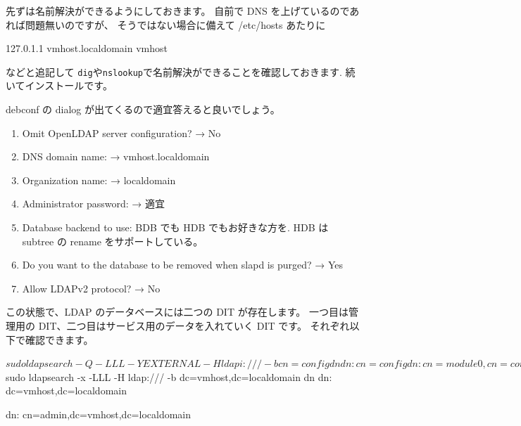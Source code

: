 \documentclass[mingoth,a4paper]{jsarticle}
\begin{document}
先ずは名前解決ができるようにしておきます。
自前で DNS を上げているのであれば問題無いのですが、
そうではない場合に備えて /etc/hosts あたりに
\begin{commandline}
  127.0.1.1     vmhost.localdomain vmhost
\end{commandline}
などと追記して
\texttt{dig}や\texttt{nslookup}で名前解決ができることを確認しておきます.
%
続いてインストールです。
debconf の dialog が出てくるので適宜答えると良いでしょう。
\begin{enumerate}
\item Omit OpenLDAP server configuration?
  → No
\item DNS domain name:
  → vmhost.localdomain
\item Organization name:
  → localdomain
\item Administrator password:
  → 適宜
\item Database backend to use: BDB でも HDB でもお好きな方を.
  HDB は subtree の rename をサポートしている。
\item Do you want to the database to be removed when slapd is purged?
  → Yes
\item Allow LDAPv2 protocol?
  → No
\end{enumerate}
この状態で、LDAP のデータベースには二つの DIT が存在します。
一つ目は管理用の DIT、二つ目はサービス用のデータを入れていく DIT です。
それぞれ以下で確認できます。
\begin{commandline}
$ sudo ldapsearch -Q -LLL -Y EXTERNAL -H ldapi:/// -b cn=config dn
dn: cn=config

dn: cn=module{0},cn=config

dn: cn=schema,cn=config

dn: cn={0}core,cn=schema,cn=config

dn: cn={1}cosine,cn=schema,cn=config

dn: cn={2}nis,cn=schema,cn=config

dn: cn={3}inetorgperson,cn=schema,cn=config

dn: olcBackend={0}hdb,cn=config

dn: olcDatabase={-1}frontend,cn=config

dn: olcDatabase={0}config,cn=config

dn: olcDatabase={1}hdb,cn=config

$ sudo ldapsearch -x -LLL -H ldap:/// -b dc=vmhost,dc=localdomain dn
dn: dc=vmhost,dc=localdomain

dn: cn=admin,dc=vmhost,dc=localdomain
\end{commandline}
\end{document}
